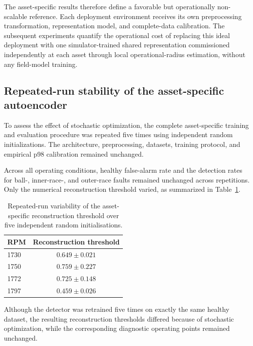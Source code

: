 \documentclass{trbunofficial}
\begin{document}
The asset-specific results therefore define a favorable but operationally
non-scalable reference. Each deployment environment receives its own
preprocessing transformation, representation model, and complete-data
calibration. The subsequent experiments quantify the operational cost of
replacing this ideal deployment with one simulator-trained shared
representation commissioned independently at each asset through local
operational-radius estimation, without any field-model training.


\subsection{Repeated-run stability of the asset-specific autoencoder}
\label{sec:ae-stability}

To assess the effect of stochastic optimization, the complete
asset-specific training and evaluation procedure was repeated five times
using independent random initializations. The architecture,
preprocessing, datasets, training protocol, and empirical p98 calibration
remained unchanged.

Across all operating conditions, healthy false-alarm rate and the
detection rates for ball-, inner-race-, and outer-race faults remained
unchanged across repetitions. Only the numerical reconstruction threshold
varied, as summarized in Table~\ref{tab:ae-threshold-stability}.

\begin{table}[!ht]
\centering
\caption{Repeated-run variability of the asset-specific reconstruction
threshold over five independent random initialisations.}
\label{tab:ae-threshold-stability}
\begin{tabular}{lc}
\toprule
RPM & Reconstruction threshold \\
\midrule
1730 & $0.649 \pm 0.021$ \\
1750 & $0.759 \pm 0.227$ \\
1772 & $0.725 \pm 0.148$ \\
1797 & $0.459 \pm 0.026$ \\
\bottomrule
\end{tabular}
\end{table}

Although the detector was retrained five times on exactly the same healthy
dataset, the resulting reconstruction thresholds differed because of
stochastic optimization, while the corresponding diagnostic operating
points remained unchanged.
\end{document}

